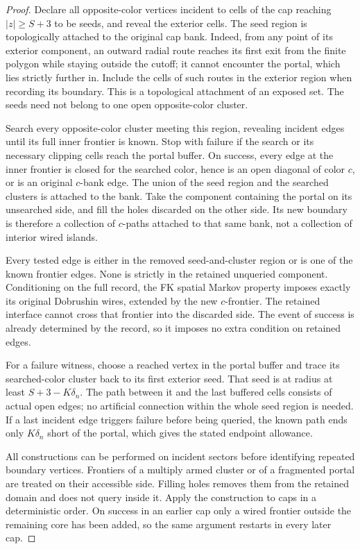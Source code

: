 \begin{proof}
Declare all opposite-color vertices incident to cells of
the cap reaching \(|z|\ge S+3\) to be seeds, and reveal
the exterior cells. The seed region is topologically
attached to the original cap bank. Indeed, from any
point of its exterior component, an outward radial
route reaches its first exit from the finite polygon
while staying outside the cutoff; it cannot encounter
the portal, which lies strictly further in. Include
the cells of such routes in the exterior region when
recording its boundary. This is a topological
attachment of an exposed set. The seeds need not
belong to one open opposite-color cluster.

Search every opposite-color cluster meeting this
region, revealing incident edges until its full
inner frontier is known. Stop with failure if the
search or its necessary clipping cells reach the
portal buffer. On success, every edge at the inner
frontier is closed for the searched color, hence is
an open diagonal of color \(c\), or is an original
\(c\)-bank edge. The union of the seed region and
the searched clusters is attached to the bank.
Take the component containing the portal on its
unsearched side, and fill the holes discarded on
the other side. Its new boundary is therefore a
collection of \(c\)-paths attached to that same
bank, not a collection of interior wired islands.

Every tested edge is either in the removed
seed-and-cluster region or is one of the known
frontier edges. None is strictly in the retained
unqueried component. Conditioning on the full
record, the FK spatial Markov property imposes
exactly its original Dobrushin wires, extended
by the new \(c\)-frontier. The retained interface
cannot cross that frontier into the discarded
side. The event of success is already determined
by the record, so it imposes no extra condition
on retained edges.

For a failure witness, choose a reached vertex in
the portal buffer and trace its searched-color
cluster back to its first exterior seed. That seed
is at radius at least \(S+3-K\delta_n\). The path
between it and the last buffered cells consists
of actual open edges; no artificial connection
within the whole seed region is needed. If a
last incident edge triggers failure before being
queried, the known path ends only \(K\delta_n\)
short of the portal, which gives the stated
endpoint allowance.

All constructions can be performed on incident
sectors before identifying repeated boundary
vertices. Frontiers of a multiply armed cluster
or of a fragmented portal are treated on their
accessible side. Filling holes removes them
from the retained domain and does not query
inside it. Apply the construction to caps in
a deterministic order. On success in an
earlier cap only a wired frontier outside
the remaining core has been added, so the
same argument restarts in every later cap.
\end{proof}

